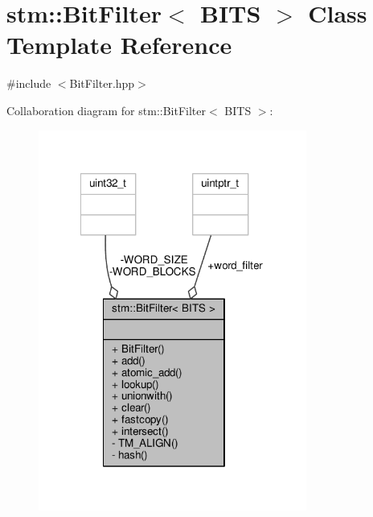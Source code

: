 \hypertarget{classstm_1_1BitFilter}{\section{stm\-:\-:Bit\-Filter$<$ B\-I\-T\-S $>$ Class Template Reference}
\label{classstm_1_1BitFilter}
}


{\ttfamily \#include $<$Bit\-Filter.\-hpp$>$}



Collaboration diagram for stm\-:\-:Bit\-Filter$<$ B\-I\-T\-S $>$\-:
\nopagebreak
\begin{figure}[H]
\begin{center}
\leavevmode
\includegraphics[width=250pt]{classstm_1_1BitFilter__coll__graph}
\end{center}
\end{figure}
